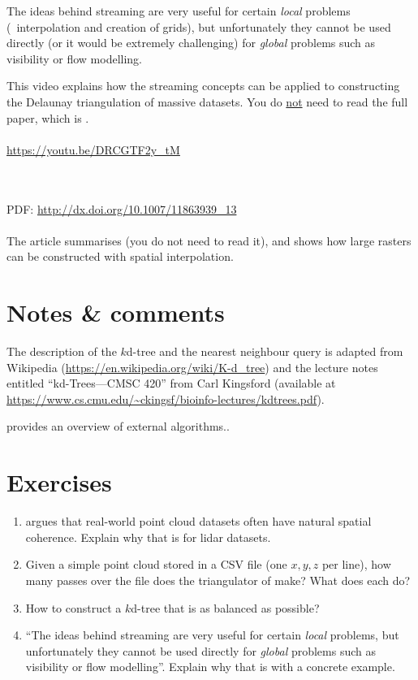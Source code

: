 The ideas behind streaming are very useful for certain \emph{local} problems (\eg\ interpolation and creation of grids), but unfortunately they cannot be used directly (or it would be extremely challenging) for \emph{global} problems such as visibility or flow modelling.

\begin{kaobox-toread}[frametitle=\faExternalLink\ To read or to watch]
  This video explains how the streaming concepts can be applied to constructing the Delaunay triangulation of massive datasets.
  You do \underline{not} need to read the full paper, which is \citet{Isenburg06}.
  \\ \\
  \url{https://youtu.be/DRCGTF2y_tM}
\end{kaobox-toread}

\begin{kaobox-toread}[frametitle=\faExternalLink\ To read or to watch]
  \\ \\
  PDF: \url{http://dx.doi.org/10.1007/11863939_13}
  \\ \\
  The article summarises \citet{Isenburg06} (you do not need to read it), and shows how large rasters can be constructed with spatial interpolation.
\end{kaobox-toread}


%
\section{Notes \& comments}

The description of the $k$d-tree and the nearest neighbour query is adapted from Wikipedia (\url{https://en.wikipedia.org/wiki/K-d_tree}) and the lecture notes entitled ``kd-Trees---CMSC 420'' from Carl Kingsford (available at \url{https://www.cs.cmu.edu/~ckingsf/bioinfo-lectures/kdtrees.pdf}).

\citet{Vitter01} provides an overview of external algorithms..


%
\section{Exercises}

\begin{enumerate}
  \item \citet{Isenburg06-1} argues that real-world point cloud datasets often have natural spatial coherence. Explain why that is for lidar datasets.
  \item Given a simple point cloud stored in a CSV file (one $x,y,z$ per line), how many passes over the file does the triangulator of \citet{Isenburg06-1} make? What does each do?
  \item How to construct a $k$d-tree that is as balanced as possible?
  \item ``The ideas behind streaming are very useful for certain \emph{local} problems, but unfortunately they cannot be used directly for \emph{global} problems such as visibility or flow modelling''. Explain why that is with a concrete example.
\end{enumerate}
